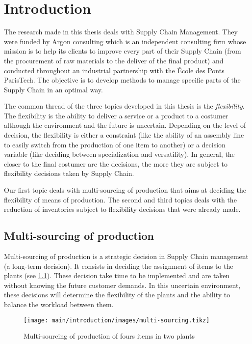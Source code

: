 \chapter{Introduction}


The research made in this thesis deals with Supply Chain Management.
They were funded by Argon consulting which is an independent consulting firm whose mission is to help its clients to improve every part of their Supply Chain (from the procurement of raw materials to the deliver of the final product) and conducted throughout an industrial partnership with the \'Ecole des Ponts ParisTech.
The objective is to develop methods to manage specific parts of the Supply Chain in an optimal way.



The common thread of the three topics developed in this thesis is the \emph{flexibility}.
The flexibility is the ability to deliver a service or a product to a costumer although the environment and the future is uncertain.
Depending on the level of decision, the flexibility is either a constraint (like the ability of an assembly line to easily switch from the production of one item to another) or a decision variable (like deciding between specialization and versatility).
In general, the closer to the final costumer are the decisions, the more they are subject to flexibility decisions taken by Supply Chain.


Our first topic deals with multi-sourcing of production that aims at deciding the flexibility of means of production.
The second and third topics deals with the reduction of inventories subject to flexibility decisions that were already made.


\section{Multi-sourcing of production}


Multi-sourcing of production is a strategic decision in Supply Chain management (\ie a long-term decision).
It consists in deciding the assignment of items to the plants (see \cref{fig:intro:en:multi-sourcing}).
These decision take time to be implemented and are taken without knowing the future customer demands.
In this uncertain environment, these decisions will determine the flexibility of the plants and the ability to balance the workload between them.


\begin{figure}[!ht]
  \centering
  \texttt{[image: main/introduction/images/multi-sourcing.tikz]}
  \caption{Multi-sourcing of production of fours items in two plants}
  \label{fig:intro:en:multi-sourcing}
\end{figure}


